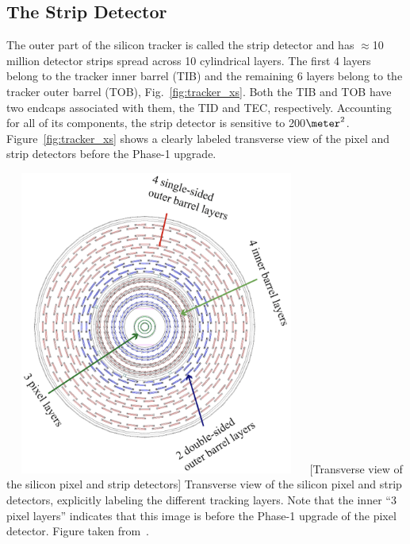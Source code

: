 \subsection{The Strip Detector}
\label{sec:strip}
The outer part of the silicon tracker is called the strip detector and has $\approx$10 million detector strips spread across 10 cylindrical layers.
The first 4 layers belong to the tracker inner barrel (TIB) and the remaining 6 layers belong to the tracker outer barrel (TOB), Fig.~\ref{fig:tracker_xs}. 
Both the TIB and TOB have two endcaps associated with them, the TID and TEC, respectively.
Accounting for all of its components, the strip detector is sensitive to 200$\meter^2$.
Figure~\ref{fig:tracker_xs} shows a clearly labeled transverse view of the pixel and strip detectors before the Phase-1 upgrade.
\begin{multiFigure}
    \centering
        \includegraphics[width=10cm,height=10cm,keepaspectratio]{figures/cms/tracker/silicon_tracker_transverse_view.png}
        [Transverse view of the silicon pixel and strip detectors]
        {Transverse view of the silicon pixel and strip detectors, explicitly labeling the different tracking layers.
        Note that the inner ``3 pixel layers'' indicates that this image is before the Phase-1 upgrade of the pixel detector.
        Figure taken from~\cite{strip_detector_xs}.}
    \label{fig:tracker_xs}
\end{multiFigure}
